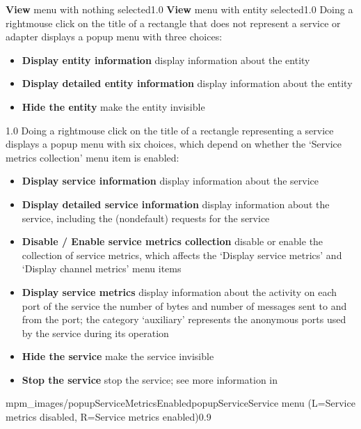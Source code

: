 %
{\textbf{View} menu with nothing selected}{1.0}
\condPage
{}%
{\textbf{View} menu with entity selected}{1.0}
Doing a right\longDash{}mouse click on the title of a rectangle that does not represent a
service or adapter displays a popup menu with three choices:
\begin{itemize}
\item\textbf{Display entity information} display information about the entity
\item\exSp\textbf{Display detailed entity information} display information about the
entity
\item\exSp\textbf{Hide the entity} make the entity invisible
\end{itemize}
%
{1.0}
\condPage{}
Doing a right\longDash{}mouse click on the title of a rectangle representing a service
displays a popup menu with six choices, which depend on whether the `Service metrics
collection' menu item is enabled:
\begin{itemize}
\item\textbf{Display service information} display information about the service
\item\exSp\textbf{Display detailed service information} display information about the
service, including the (non\longDash{}default) requests for the service
\item\exSp\textbf{Disable / Enable service metrics collection} disable or enable the
collection of service metrics, which affects the `Display service metrics' and `Display
channel metrics' menu items
\item\exSp\textbf{Display service metrics} display information about the activity on each
port of the service \longDash{} the number of bytes and number of messages sent to and
from the port; the category `auxiliary' represents the anonymous ports used by the service
during its operation
\item\exSp\textbf{Hide the service} make the service invisible
\item\exSp\textbf{Stop the service} stop the service; see more information in
\end{itemize}
%
{mpm_images/popupServiceMetricsEnabled}{popupService}{Service menu (L=Service metrics
disabled, R=Service metrics enabled)}{0.9}
